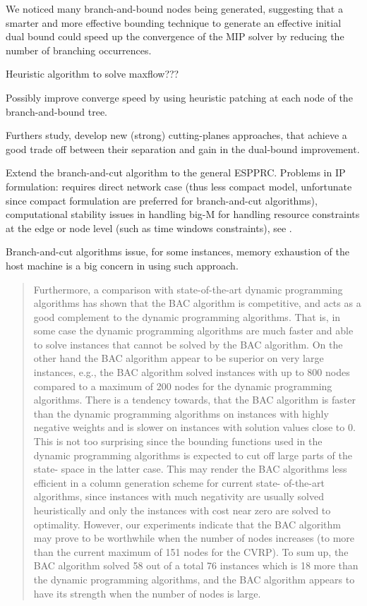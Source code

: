 \medskip

We noticed many branch-and-bound nodes being generated,
suggesting that a smarter and more effective bounding technique to
generate an effective initial dual bound could speed up the convergence
of the MIP solver by reducing the number of branching occurrences.

Heuristic algorithm to solve maxflow???

Possibly improve converge speed by using heuristic patching at each
node of the branch-and-bound tree.


Furthers study, develop new (strong) cutting-planes approaches,
that achieve a good trade off between their separation and gain
in the dual-bound improvement.


Extend the branch-and-cut algorithm
to the general ESPPRC.
Problems in IP formulation:
requires direct network case (thus less compact model, unfortunate since compact formulation are
preferred for branch-and-cut algorithms),
computational stability issues in handling big-M
for handling resource constraints at the edge or node level (such as time windows constraints),
see \textcite{jepsen2008branchandcut}.

Branch-and-cut algorithms issue, for some instances,
memory exhaustion of the host machine is a big concern in using such approach.

\begin{quote}
	\cite{jepsen2014}
	Furthermore, a comparison with state-of-the-art dynamic programming algorithms has
	shown that the BAC algorithm is competitive, and acts as a good complement to the dynamic programming algorithms.
	That is, in some case the dynamic programming algorithms are much faster and able to solve instances that cannot be
	solved by the BAC algorithm. On the other hand the BAC algorithm appear to be superior on very large instances, e.g., the
	BAC algorithm solved instances with up to 800 nodes compared to a maximum of 200 nodes for the dynamic programming
	algorithms. There is a tendency towards, that the BAC algorithm is faster than the dynamic programming algorithms on
	instances with highly negative weights and is slower on instances with solution values close to 0. This is not too surprising
	since the bounding functions used in the dynamic programming algorithms is expected to cut off large parts of the state-
	space in the latter case. This may render the BAC algorithms less efficient in a column generation scheme for current state-
	of-the-art algorithms, since instances with much negativity are usually solved heuristically and only the instances with cost
	near zero are solved to optimality. However, our experiments indicate that the BAC algorithm may prove to be worthwhile
	when the number of nodes increases (to more than the current maximum of 151 nodes for the CVRP). To sum up, the BAC
	algorithm solved 58 out of a total 76 instances which is 18 more than the dynamic programming algorithms, and the BAC
	algorithm appears to have its strength when the number of nodes is large.
\end{quote}

